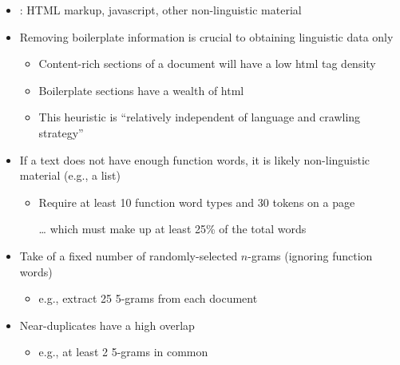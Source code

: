 \documentclass[a4paper,landscape,headrule,footrule,xetex]{foils}
\begin{document}
\begin{itemize}
\item {}: HTML markup, javascript, other non-linguistic
  material
\item Removing boilerplate information is crucial to obtaining
  linguistic data only
  \begin{itemize}
  \item Content-rich sections of a document will have a low 
    html tag density
  \item Boilerplate sections have a wealth of html
  \item This heuristic is ``relatively independent of language and
    crawling strategy''
  \end{itemize}
\item If a text does not have enough function words, it is likely
non-linguistic material (e.g., a list)
\begin{itemize}
\item Require at least 10 function word types and 30 tokens on a page
\item[\ldots]  which must make up at least 25\% of the total
words
\end{itemize}
\end{itemize}

\begin{itemize}
\item Take  of a fixed number of randomly-selected $n$-grams (ignoring function words)
  \begin{itemize}
  \item e.g., extract 25 5-grams from each document
  \end{itemize}
\item Near-duplicates have a high overlap
 \begin{itemize}
 \item e.g., at least 2 5-grams in common
 \end{itemize}
\end{itemize}


\end{document}
